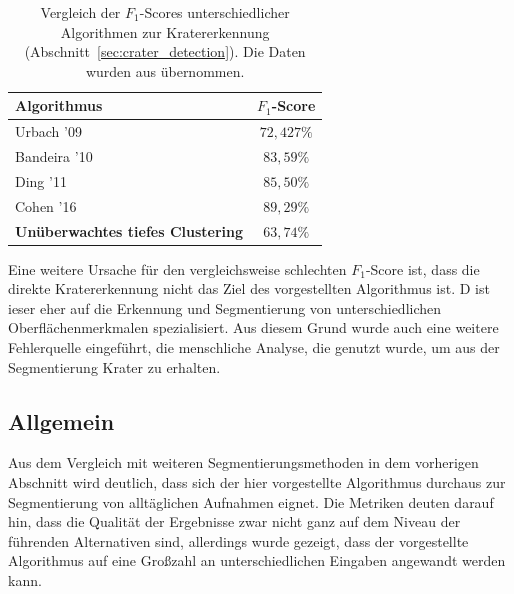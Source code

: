 \begin{table}[H]
	\begin{tabular}{l c}
		\toprule
		\textbf{Algorithmus} & \textbf{$F_1$-Score} \\
		\midrule
		Urbach '09 \cite{urbach_stepinski_2009} & $72,427\%$ \\
		Bandeira '10 \cite{bandeira_10} & $83,59\%$ \\
		Ding '11 \cite{ding_11} & $85,50\%$ \\
		Cohen '16 \cite{cohen_16} & $89,29\%$ \\
		\textbf{Unüberwachtes tiefes Clustering} & $63,74\%$\\
		\bottomrule
	\end{tabular}
	\caption{Vergleich der $F_1$-Scores unterschiedlicher Algorithmen zur Kratererkennung (\vgl Abschnitt~\ref{sec:crater_detection}). Die Daten wurden aus \cite{cohen_16} übernommen.}
	\label{tab:f1_comparision}
\end{table}

Eine weitere Ursache für den vergleichsweise schlechten $F_1$-Score ist, dass die direkte Kratererkennung nicht das Ziel des vorgestellten Algorithmus ist. D ist ieser eher auf die Erkennung und Segmentierung von unterschiedlichen Oberflächenmerkmalen spezialisiert. Aus diesem Grund wurde auch eine weitere Fehlerquelle eingeführt, die menschliche Analyse, die genutzt wurde, um aus der Segmentierung Krater zu erhalten.

\subsection{Allgemein}
Aus dem Vergleich mit weiteren Segmentierungsmethoden in dem vorherigen Abschnitt wird deutlich, dass sich der hier vorgestellte Algorithmus durchaus zur Segmentierung von alltäglichen Aufnahmen eignet. Die Metriken deuten darauf hin, dass die Qualität der Ergebnisse zwar nicht ganz auf dem Niveau der führenden Alternativen sind, allerdings wurde gezeigt, dass der vorgestellte Algorithmus auf eine Großzahl an unterschiedlichen Eingaben angewandt werden kann.

